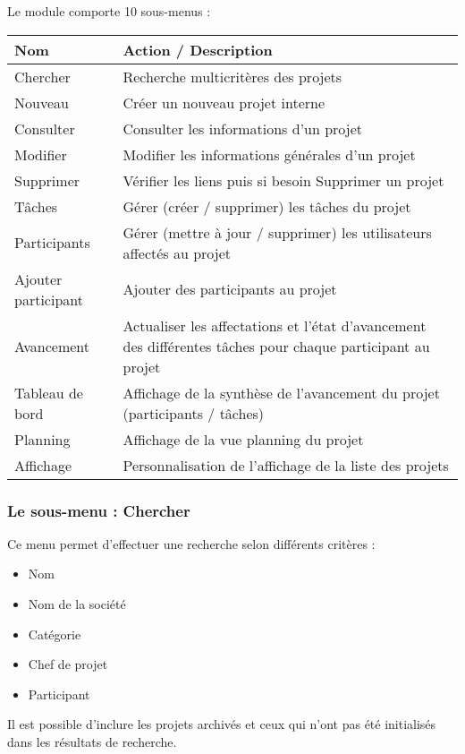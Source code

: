 Le module \project comporte 10 sous-menus :\\

\begin{tabular}{|p{2.5cm}|p{9.5cm}|}
\hline
\textbf{Nom} & \textbf{Action / Description} \\
\hline
Chercher & Recherche multicritères des projets \\
\hline
Nouveau & Créer un nouveau projet interne\\
\hline
Consulter & Consulter les informations d'un projet\\
\hline
Modifier & Modifier les informations générales d'un projet\\
\hline
Supprimer & Vérifier les liens puis si besoin Supprimer un projet\\
\hline
Tâches & Gérer (créer / supprimer) les tâches du projet\\
\hline
Participants & Gérer (mettre à jour / supprimer) les utilisateurs affectés au projet\\
\hline
Ajouter participant & Ajouter des participants au projet\\
\hline
Avancement & Actualiser les affectations et l'état d'avancement des différentes tâches pour chaque participant au projet\\
\hline
Tableau de bord & Affichage de la synthèse de l'avancement du projet (participants / tâches)\\
\hline
Planning & Affichage de la vue planning du projet\\
\hline
Affichage & Personnalisation de l'affichage de la liste des projets\\
\hline
\end{tabular}


\subsubsection{Le sous-menu : Chercher}

Ce menu permet d'effectuer une recherche selon différents critères :

\begin{itemize}
\item Nom
\item Nom de la société
\item Catégorie
\item Chef de projet
\item Participant
\end{itemize}

Il est possible d'inclure les projets archivés et ceux qui n'ont pas été initialisés dans les résultats de recherche.

